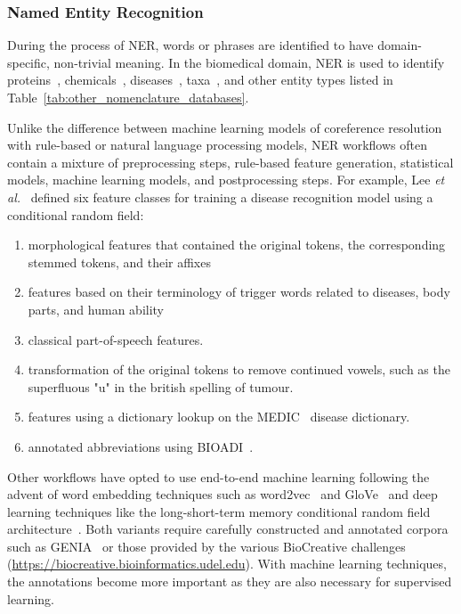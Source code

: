 \subsubsection*{Named Entity Recognition}

During the process of \ac{NER}, words or phrases are identified to have domain-specific, non-trivial meaning.
In the biomedical domain, \ac{NER} is used to identify proteins~\cite{Hsu2008,Leaman2008, Hakenberg2011,Wei2015}, chemicals~\cite{Leaman2015,Corbett2018,Giorgi526244}, diseases~\cite{Leaman2013,Giorgi526244}, taxa~\cite{Gerner2010,Wei2012}, and other entity types listed in Table~\ref{tab:other_nomenclature_databases}.

Unlike the difference between machine learning models of coreference resolution with rule-based or natural language processing models, \ac{NER} workflows often contain a mixture of preprocessing steps, rule-based feature generation, statistical models, machine learning models, and postprocessing steps.
For example, Lee \textit{et al.}~\cite{Lee2015} defined six feature classes for training a disease recognition model using a conditional random field:
\begin{enumerate}
    \item morphological features that contained the original tokens, the corresponding stemmed tokens, and their affixes
    \item features based on their terminology of trigger words related to diseases, body parts, and human ability
    \item classical part-of-speech features.
    \item transformation of the original tokens to remove continued vowels, such as the superfluous "u" in the british spelling of tumour.
    \item features using a dictionary lookup on the MEDIC~\cite{Davis2012} disease dictionary.
    \item annotated abbreviations using BIOADI~\cite{Kuo2009}.
\end{enumerate}

Other workflows have opted to use end-to-end machine learning following the advent of word embedding techniques such as word2vec~\cite{Mikolov2013} and GloVe~\cite{Pennington2014} and deep learning techniques like the long-short-term memory conditional random field architecture~\cite{Lample2016}.
Both variants require carefully constructed and annotated corpora such as GENIA~\cite{Kim2003} or those provided by the various BioCreative challenges (\url{https://biocreative.bioinformatics.udel.edu}).
With machine learning techniques, the annotations become more important as they are also necessary for supervised learning.

